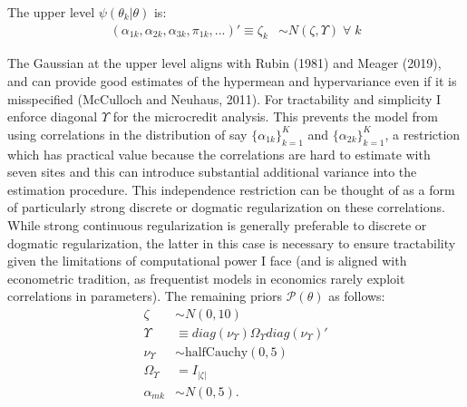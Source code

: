 \documentclass[english,12pt]{article}\usepackage{lmodern}
\numberwithin{equation}{section}
\begin{document}
 The upper level $\psi(\theta_k | \theta)$ is:
\begin{equation}\label{upperPDF}
\begin{aligned}
(\alpha_{1k}, \alpha_{2k}, \alpha_{3k}, \pi_{1k},...)' \equiv \zeta_k &\sim N(\zeta, \Upsilon) \; \forall \; k
\end{aligned} \end{equation}

The Gaussian at the upper level aligns with Rubin (1981) and Meager (2019), and can provide good estimates of the hypermean and hypervariance even if it is misspecified (McCulloch and Neuhaus, 2011). For tractability and simplicity I enforce diagonal $\Upsilon$ for the microcredit analysis. This prevents the model from using correlations in the distribution of say $\{\alpha_{1k}\}_{k=1}^{K}$ and $\{\alpha_{2k}\}_{k=1}^{K}$, a restriction which has practical value because the correlations are hard to estimate with seven sites and this can introduce substantial additional variance into the estimation procedure. This independence restriction can be thought of as a form of particularly strong discrete or dogmatic regularization on these correlations. While strong continuous regularization is generally preferable to discrete or dogmatic regularization, the latter in this case is necessary to ensure tractability given the limitations of computational power I face (and is aligned with econometric tradition, as frequentist models in economics rarely exploit correlations in parameters). The remaining priors $\mathcal{P}(\theta)$ as follows:
\begin{equation}
\begin{aligned}
\zeta &\sim N(0,10)\\
\Upsilon &\equiv diag(\nu_{\Upsilon})\Omega_{\Upsilon} diag(\nu_{\Upsilon})' \\
\nu_{\Upsilon} &\sim \text{halfCauchy}(0,5)\\
\Omega_{\Upsilon} &= I_{| \zeta |} \\
\alpha_{mk} &\sim N(0,5).
\end{aligned} \end{equation}
\end{document}

